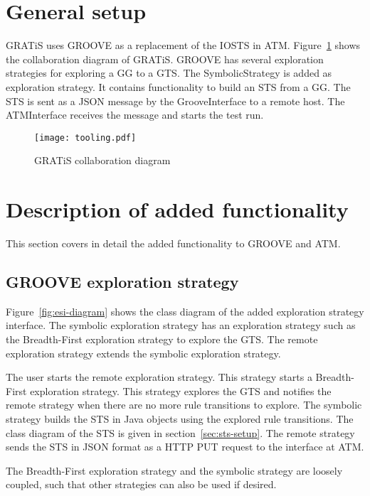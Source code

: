 \section{General setup}\label{sec:general-setup}
GRATiS uses GROOVE as a replacement of the IOSTS in ATM. Figure~\ref{fig:tooling} shows the collaboration diagram of GRATiS. GROOVE has several exploration strategies for exploring a GG to a GTS. The SymbolicStrategy is added as exploration strategy. It contains functionality to build an STS from a GG. The STS is sent as a JSON message by the GrooveInterface to a remote host. The ATMInterface receives the message and starts the test run.

\begin{figure}[ht]
  \begin{center}
    \texttt{[image: tooling.pdf]}
  \end{center}
  \caption{GRATiS collaboration diagram}
  \label{fig:tooling}
\end{figure}


\section{Description of added functionality}
This section covers in detail the added functionality to GROOVE and ATM. 

\subsection{GROOVE exploration strategy}
Figure~\ref{fig:esi-diagram} shows the class diagram of the added exploration strategy interface. The symbolic exploration strategy has an exploration strategy such as the Breadth-First exploration strategy to explore the GTS. The remote exploration strategy extends the symbolic exploration strategy.

The user starts the remote exploration strategy. This strategy starts a Breadth-First exploration strategy. This strategy explores the GTS and notifies the remote strategy when there are no more rule transitions to explore. The symbolic strategy builds the STS in Java objects using the explored rule transitions. The class diagram  of the STS is given in section~\ref{sec:sts-setup}. The remote strategy sends the STS in JSON format as a HTTP PUT request to the interface at ATM.

The Breadth-First exploration strategy and the symbolic strategy are loosely coupled, such that other strategies can also be used if desired.
 
